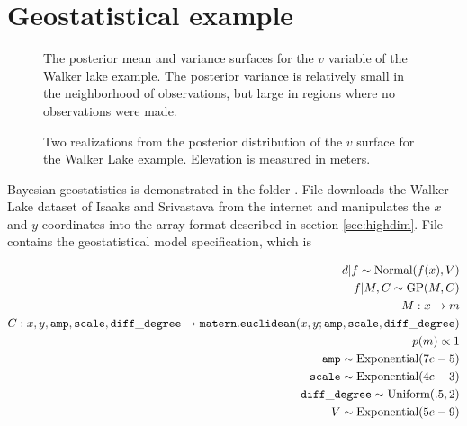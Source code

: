 \section{Geostatistical example}\label{sub:geostat}
\begin{figure}
    \centering
    \caption{The posterior mean and variance surfaces for the $v$ variable of the Walker lake example. The posterior variance is relatively small in the neighborhood of observations, but large in regions where no observations were made.}
    \label{fig:walker}
\end{figure}
\begin{figure}
    \centering
    \caption{Two realizations from the posterior distribution of the $v$ surface for the Walker Lake example. Elevation is measured in meters.}
    \label{fig:walkerreal}
\end{figure}
Bayesian geostatistics is demonstrated in the folder . File  downloads the Walker Lake dataset of Isaaks and Srivastava \cite{isaaks} from the internet and manipulates the $x$ and $y$ coordinates into the array format described in section \ref{sec:highdim}. File  contains the geostatistical model specification, which is

\begin{eqnarray*}
    d|f \sim \textup{Normal}(f(x),V)\\
    f|M,C \sim \textup{GP}(M,C) \\
    M:x\rightarrow m\\
    C:x,y,\mathtt{amp},\mathtt{scale},\mathtt{diff\_degree}\rightarrow \mathtt{matern.euclidean}(x,y;\mathtt{amp},\mathtt{scale},\mathtt{diff\_degree})\\
    p(m)\propto 1\\
    \mathtt{amp}\sim \textup{Exponential}(7e-5) \\
    \mathtt{scale}\sim \textup{Exponential}(4e-3) \\
    \mathtt{diff\_degree}\sim \textup{Uniform}(.5,2)\\ 
    V\sim \textup{Exponential}(5e-9)\\
\end{eqnarray*}

